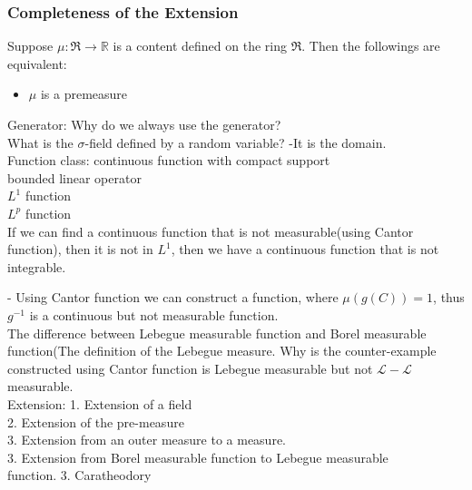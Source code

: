 \subsubsection*{Completeness of the Extension}

\begin{theorem}
	Suppose $\mu : \mathfrak{R} \rightarrow \mathbb{R}$ is a content defined on the ring $\mathfrak{R}$. Then the followings are equivalent:
	\begin{itemize}
		\item $\mu$ is a premeasure
	\end{itemize}
\end{theorem}

\begin{theorem}
\end{theorem}

Generator: Why do we always use the generator?\\
What is the $\sigma$-field defined by a random variable? -It is the domain.\\

Function class: continuous function with compact support\\
bounded linear operator\\
$L^1$ function\\
$L^p$ function\\

If we can find a continuous function that is not measurable(using Cantor function), then it is not in $L^1$, then we have a continuous function that is not integrable.

\begin{example}
\end{example}

- Using Cantor function we can construct a function, where $\mu (g(C)) = 1$, thus $g^{-1}$ is a continuous but not measurable function. \\
The difference between Lebegue measurable function and Borel measurable function(The definition of the Lebegue measure. Why is the counter-example constructed using Cantor function is Lebegue measurable but not $\mathcal{L}-\mathcal{L}$ measurable.\\
Extension:
1. Extension of a field\\
2. Extension of the pre-measure\\
3. Extension from an outer measure to a measure.\\
3. Extension from Borel measurable function to Lebegue measurable\\ function.
3. Caratheodory\\



